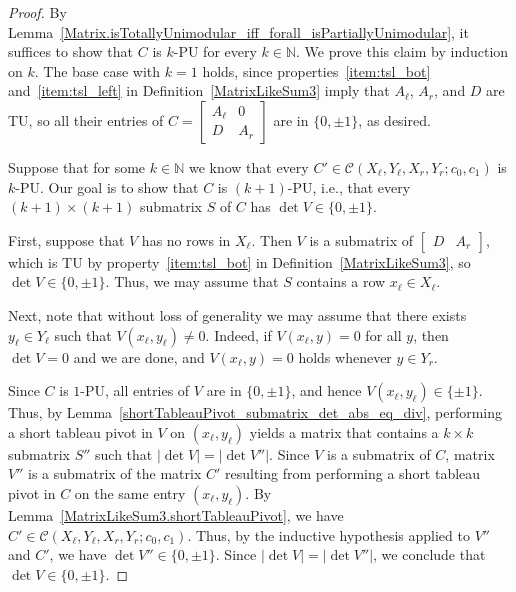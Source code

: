 \begin{proof}
    By Lemma~\ref{Matrix.isTotallyUnimodular_iff_forall_isPartiallyUnimodular}, it suffices to show that $C$ is $k$-PU for every $k \in \mathbb{N}$. We prove this claim by induction on $k$. The base case with $k = 1$ holds, since properties~\ref{item:tsl_bot} and~\ref{item:tsl_left} in Definition~\ref{MatrixLikeSum3} imply that $A_{\ell}$, $A_{r}$, and $D$ are TU, so all their entries of $C = \begin{bmatrix} A_{\ell} & 0 \\ D & A_{r} \end{bmatrix}$ are in $\{0, \pm 1\}$, as desired.

    Suppose that for some $k \in \mathbb{N}$ we know that every $C' \in \mathcal{C} (X_{\ell}, Y_{\ell}, X_{r}, Y_{r}; c_{0}, c_{1})$ is $k$-PU. Our goal is to show that $C$ is $(k + 1)$-PU, i.e., that every $(k + 1) \times (k + 1)$ submatrix $S$ of $C$ has $\det V \in \{0, \pm 1\}$.

    First, suppose that $V$ has no rows in $X_{\ell}$. Then $V$ is a submatrix of $\begin{bmatrix} D & A_{r} \end{bmatrix}$, which is TU by property~\ref{item:tsl_bot} in Definition~\ref{MatrixLikeSum3}, so $\det V \in \{0, \pm 1\}$. Thus, we may assume that $S$ contains a row $x_{\ell} \in X_{\ell}$.

    Next, note that without loss of generality we may assume that there exists $y_{\ell} \in Y_{\ell}$ such that $V (x_{\ell}, y_{\ell}) \neq 0$. Indeed, if $V (x_{\ell}, y) = 0$ for all $y$, then $\det V = 0$ and we are done, and $V (x_{\ell}, y) = 0$ holds whenever $y \in Y_{r}$.

    Since $C$ is $1$-PU, all entries of $V$ are in $\{0, \pm 1\}$, and hence $V (x_{\ell}, y_{\ell}) \in \{\pm 1\}$. Thus, by Lemma~\ref{shortTableauPivot_submatrix_det_abs_eq_div}, performing a short tableau pivot in $V$ on $(x_{\ell}, y_{\ell})$ yields a matrix that contains a $k \times k$ submatrix $S''$ such that $|\det V| = |\det V''|$. Since $V$ is a submatrix of $C$, matrix $V''$ is a submatrix of the matrix $C'$ resulting from performing a short tableau pivot in $C$ on the same entry $(x_{\ell}, y_{\ell})$. By Lemma~\ref{MatrixLikeSum3.shortTableauPivot}, we have $C' \in \mathcal{C} (X_{\ell}, Y_{\ell}, X_{r}, Y_{r}; c_{0}, c_{1})$. Thus, by the inductive hypothesis applied to $V''$ and $C'$, we have $\det V'' \in \{0, \pm 1\}$. Since $|\det V| = |\det V''|$, we conclude that $\det V \in \{0, \pm 1\}$.
\end{proof}

